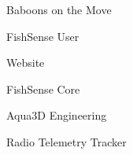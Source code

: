 \item Baboons on the Move
\item FishSense User
\item Website
\item FishSense Core
\item Aqua3D Engineering
\item Radio Telemetry Tracker
